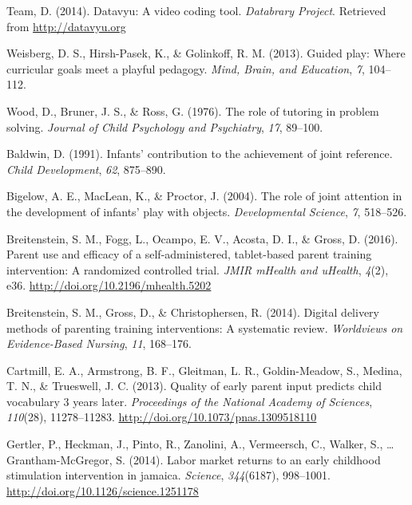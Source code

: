 \documentclass[man,floatsintext]{apa6}
\begin{document}
\leavevmode\hypertarget{ref-datavyu}{}%
Team, D. (2014). Datavyu: A video coding tool. \emph{Databrary Project}. Retrieved from \url{http://datavyu.org}

\leavevmode\hypertarget{ref-Weisberg2013}{}%
Weisberg, D. S., Hirsh-Pasek, K., \& Golinkoff, R. M. (2013). Guided play: Where curricular goals meet a playful pedagogy. \emph{Mind, Brain, and Education}, \emph{7}, 104--112.

\leavevmode\hypertarget{ref-Wood1976}{}%
Wood, D., Bruner, J. S., \& Ross, G. (1976). The role of tutoring in problem solving. \emph{Journal of Child Psychology and Psychiatry}, \emph{17}, 89--100.

\leavevmode\hypertarget{ref-Baldwin1991}{}%
Baldwin, D. (1991). Infants' contribution to the achievement of joint reference. \emph{Child Development}, \emph{62}, 875--890.

\leavevmode\hypertarget{ref-Bigelow2004}{}%
Bigelow, A. E., MacLean, K., \& Proctor, J. (2004). The role of joint attention in the development of infants' play with objects. \emph{Developmental Science}, \emph{7}, 518--526.

\leavevmode\hypertarget{ref-Breitenstein2016}{}%
Breitenstein, S. M., Fogg, L., Ocampo, E. V., Acosta, D. I., \& Gross, D. (2016). Parent use and efficacy of a self-administered, tablet-based parent training intervention: A randomized controlled trial. \emph{JMIR mHealth and uHealth}, \emph{4}(2), e36. \url{http://doi.org/10.2196/mhealth.5202}

\leavevmode\hypertarget{ref-Breitenstein2014}{}%
Breitenstein, S. M., Gross, D., \& Christophersen, R. (2014). Digital delivery methods of parenting training interventions: A systematic review. \emph{Worldviews on Evidence-Based Nursing}, \emph{11}, 168--176.

\leavevmode\hypertarget{ref-Cartmill2013}{}%
Cartmill, E. A., Armstrong, B. F., Gleitman, L. R., Goldin-Meadow, S., Medina, T. N., \& Trueswell, J. C. (2013). Quality of early parent input predicts child vocabulary 3 years later. \emph{Proceedings of the National Academy of Sciences}, \emph{110}(28), 11278--11283. \url{http://doi.org/10.1073/pnas.1309518110}

\leavevmode\hypertarget{ref-Jamaica2014}{}%
Gertler, P., Heckman, J., Pinto, R., Zanolini, A., Vermeersch, C., Walker, S., \ldots{} Grantham-McGregor, S. (2014). Labor market returns to an early childhood stimulation intervention in jamaica. \emph{Science}, \emph{344}(6187), 998--1001. \url{http://doi.org/10.1126/science.1251178}
\end{document}
